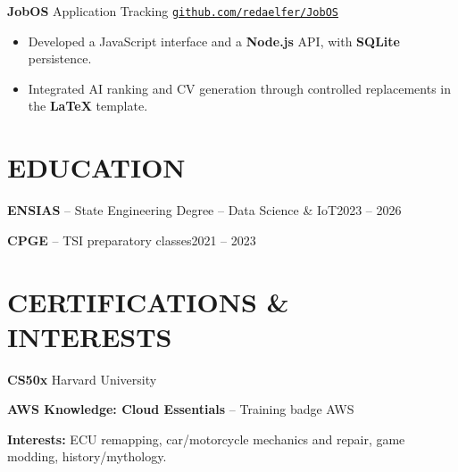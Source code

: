 \documentclass[11pt,a4paper]{article}
\newcommand{\entry}[2]{\noindent #1\hfill #2\par}
\newcommand{\jobgap}{\vspace{5pt}}
\begin{document}
\jobgap
\textbf{JobOS} \textbar{} Application Tracking \textbar{} \href{https://github.com/redaelfer/JobOS}{\nolinkurl{github.com/redaelfer/JobOS}}\par
\begin{itemize}
  \item Developed a JavaScript interface and a \textbf{Node.js} API, with \textbf{SQLite} persistence.
  \item Integrated AI ranking and CV generation through controlled replacements in the \textbf{LaTeX} template.
\end{itemize}

\section*{EDUCATION}
\entry{\textbf{ENSIAS} -- State Engineering Degree -- Data Science \& IoT}{2023 -- 2026}
\vspace{3pt}
\entry{\textbf{CPGE} -- TSI preparatory classes}{2021 -- 2023}

\section*{CERTIFICATIONS \& INTERESTS}
\textbf{CS50x} \textbar{} Harvard University\par
\vspace{3pt}
\textbf{AWS Knowledge: Cloud Essentials} -- Training badge \textbar{} AWS\par

\vspace{5pt}
\textbf{Interests:} ECU remapping, car/motorcycle mechanics and repair, game modding, history/mythology.
\end{document}
